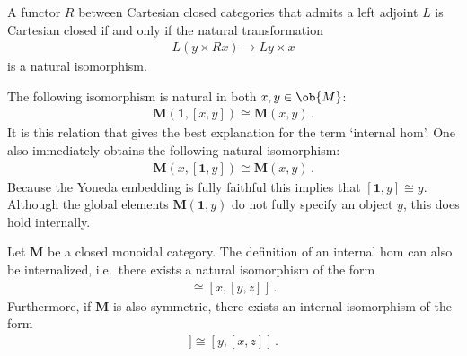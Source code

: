     \begin{property}
        A functor $R$ between Cartesian closed categories that admits a left adjoint $L$ is Cartesian closed if and only if the natural transformation
        \begin{gather}
            L(y\times Rx)\rightarrow Ly\times x
        \end{gather}
        is a natural isomorphism.
    \end{property}

    \begin{property}\label{cat:internal_hom_property}
        The following isomorphism is natural in both $x,y\in\ob{M}$:
        \begin{gather}
            \mathbf{M}(\mathbf{1},[x,y])\cong\mathbf{M}(x,y)\,.
        \end{gather}
        It is this relation that gives the best explanation for the term `internal hom'. One also immediately obtains the following natural isomorphism:
        \begin{gather}
            \mathbf{M}(x,[\mathbf{1},y])\cong\mathbf{M}(x,y)\,.
        \end{gather}
        Because the Yoneda embedding is fully faithful this implies that $[\mathbf{1},y]\cong y$. Although the global elements $\mathbf{M}(\mathbf{1},y)$ do not fully specify an object $y$, this does hold internally.
    \end{property}

    \begin{property}[Symmetry]\label{cat:internal_symmetry}
        Let $\mathbf{M}$ be a closed monoidal category. The definition of an internal hom can also be internalized, i.e.~there exists a natural isomorphism of the form
        \begin{gather}
            [x\otimes y,z]\cong[x,[y,z]]\,.
        \end{gather}
        Furthermore, if $\mathbf{M}$ is also symmetric, there exists an internal isomorphism of the form
        \begin{gather}
            [x,[y,z]]\cong[y,[x,z]]\,.
        \end{gather}
    \end{property}

